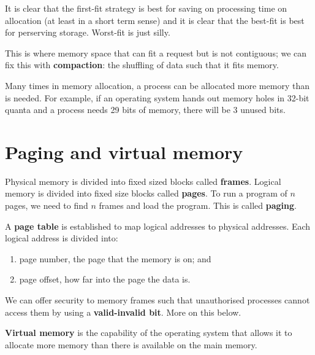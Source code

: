 It is clear that the first-fit strategy is best for saving on processing time on allocation (at least in a short term sense) and it is clear that the best-fit is best for perserving storage. Worst-fit is just silly.

\begin{definition}
    This is where memory space that can fit a request but is not contiguous; we can fix this with \textbf{compaction}: the shuffling of data such that it fits memory.
\end{definition}

\begin{definition}
    Many times in memory allocation, a process can be allocated more memory than is needed. For example, if an operating system hands out memory holes in 32-bit quanta and a process needs 29 bits of memory, there will be 3 unused bits.
\end{definition}

\section{Paging and virtual memory}

\begin{definition}[Paging]
    Physical memory is divided into fixed sized blocks called \textbf{frames}. Logical memory is divided into fixed size blocks called \textbf{pages}. To run a program of $n$ pages, we need to find $n$ frames and load the program. This is called \textbf{paging}.
\end{definition}

A \textbf{page table} is established to map logical addresses to physical addresses. Each logical address is divided into:
\begin{enumerate}
    \item page number, the page that the memory is on; and
    \item page offset, how far into the page the data is.
\end{enumerate}

We can offer security to memory frames such that unauthorised processes cannot access them by using a \textbf{valid-invalid bit}. More on this below.

\begin{definition}
    \textbf{Virtual memory} is the capability of the operating system that allows it to allocate more memory than there is available on the main memory. 
\end{definition}

